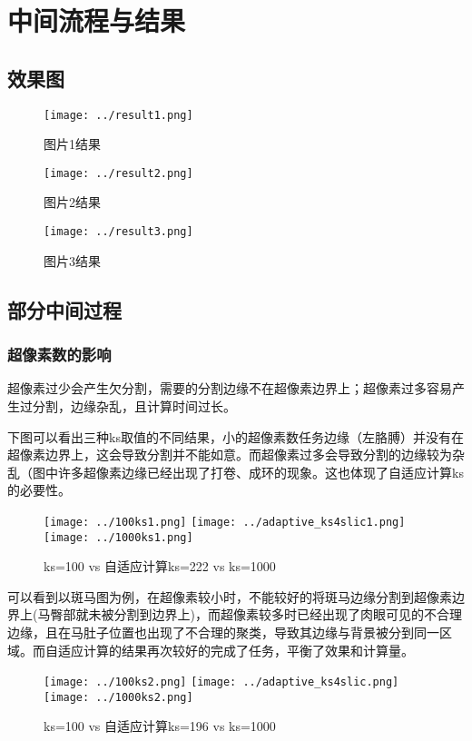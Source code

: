 \documentclass[UTF8]{ctexart}
\begin{document}
\section{中间流程与结果}

\subsection{效果图}
\begin{figure}[H]
    \centering
    \texttt{[image: ../result1.png]}
    \caption{图片1结果}
\end{figure}

\begin{figure}[H]
    \centering
    \texttt{[image: ../result2.png]}
    \caption{图片2结果}
\end{figure}

\begin{figure}[H]
    \centering
    \texttt{[image: ../result3.png]}
    \caption{图片3结果}
\end{figure}


\subsection{部分中间过程}
\subsubsection{超像素数的影响}
超像素过少会产生欠分割，需要的分割边缘不在超像素边界上；超像素过多容易产生过分割，边缘杂乱，且计算时间过长。

下图可以看出三种ks取值的不同结果，小的超像素数任务边缘（左胳膊）并没有在超像素边界上，这会导致分割并不能如意。而超像素过多会导致分割的边缘较为杂乱（图中许多超像素边缘已经出现了打卷、成环的现象。这也体现了自适应计算ks的必要性。
\begin{figure}[H]
    \centering
    \texttt{[image: ../100ks1.png]}
    \texttt{[image: ../adaptive\_ks4slic1.png]}
    \texttt{[image: ../1000ks1.png]}
    \caption{ks=100 vs 自适应计算ks=222 vs ks=1000}
\end{figure}

可以看到以斑马图为例，在超像素较小时，不能较好的将斑马边缘分割到超像素边界上(马臀部就未被分割到边界上)，而超像素较多时已经出现了肉眼可见的不合理边缘，且在马肚子位置也出现了不合理的聚类，导致其边缘与背景被分到同一区域。而自适应计算的结果再次较好的完成了任务，平衡了效果和计算量。
\begin{figure}[H]
    \centering
    \texttt{[image: ../100ks2.png]}
    \texttt{[image: ../adaptive\_ks4slic.png]}
    \texttt{[image: ../1000ks2.png]}
    \caption{ks=100 vs 自适应计算ks=196 vs ks=1000}
\end{figure}
\end{document}
